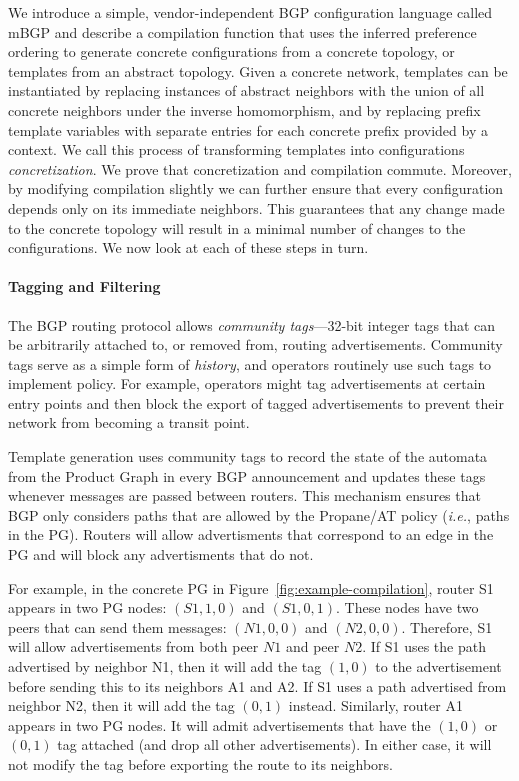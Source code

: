 \documentclass[numbers, 10pt, preprint]{sigplanconf}
\newcommand{\IE}{\emph{i.e.}}
\newcommand{\sysname}{{\text{}\small \sf Propane/AT}\xspace}
\newcommand{\mbgp}{{\small \sf mBGP}\xspace}
\newcommand{\para}[1]{\paragraph*{\textbf{#1}}}
\begin{document}
We introduce a simple, vendor-independent BGP configuration language called \mbgp and describe a compilation function that uses the inferred preference ordering to generate concrete configurations from a concrete topology, or templates from an abstract topology. Given a concrete network, templates can be instantiated by replacing instances of abstract neighbors with the union of all concrete neighbors under the inverse homomorphism, and by replacing prefix template variables with separate entries for each concrete prefix provided by a context. 
 We call this process of transforming templates into configurations \emph{concretization}.  We prove that concretization and compilation commute. Moreover, by modifying compilation slightly we can further ensure that every configuration depends only on its immediate neighbors. This guarantees that any change made to the concrete topology will result in a minimal number of changes to the configurations.
%
We now look at each of these steps in turn.
 

\para{Tagging and Filtering}

The BGP routing protocol allows \emph{community tags}---32-bit integer tags that can be arbitrarily attached to, or removed from, routing advertisements. 
Community tags serve as a simple form of \emph{history}, and operators routinely use such tags to implement policy. For example, operators might tag advertisements at certain entry points and then block the export of tagged 
advertisements to prevent their network from becoming a transit point.

Template generation uses community tags to record the state of the automata from the Product Graph in every BGP announcement and updates these tags whenever messages are passed between routers. This mechanism ensures that BGP only considers paths that are allowed by the \sysname policy (\IE, paths in the PG). Routers will allow advertisments that correspond to an edge in the PG and will block any advertisments that do not.

For example, in the concrete PG in Figure~\ref{fig:example-compilation}, router S1 appears in two PG nodes: $(S1,1,0)$ and $(S1,0,1)$. These nodes have two peers that can send them messages: $(N1,0,0)$ and $(N2,0,0)$. Therefore, S1 will allow advertisements from both peer $N1$ and peer $N2$. If S1 uses the path advertised by neighbor N1, then it will add the tag $(1,0)$ to the advertisement before sending this to its neighbors A1 and A2. If S1 uses a path advertised from neighbor N2, then it will add the tag $(0,1)$ instead. Similarly, router A1 appears in two PG nodes. It will admit advertisements that have the $(1,0)$ or $(0,1)$ tag attached (and drop all other advertisements). In either case, it will not modify the tag before exporting the route to its neighbors.
\end{document}
